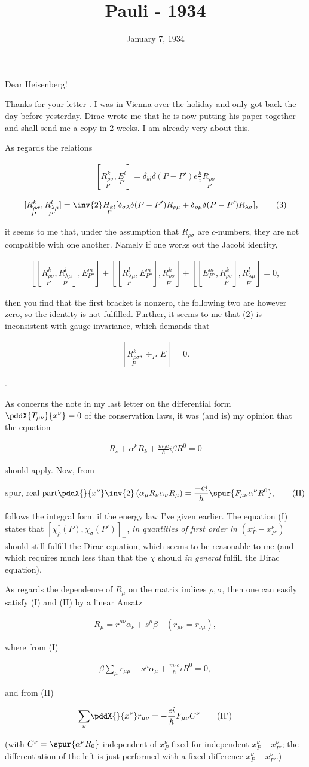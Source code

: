 \documentclass{article}
\title{Pauli - 1934}
\newcommand{\nequ}[2]{
\begin{align*}
#1
\tag{#2}
\end{align*}
}
\newcommand{\uequ}[1]{
\begin{align*}
#1
\end{align*}
}
\newcommand{\sumX}[1]{\underset{#1}{\sum}}
\begin{document}
\date{January 7, 1934}

Dear Heisenberg!

Thanks for your letter . I was in Vienna over the holiday and only got back the day before yesterday. Dirac wrote me that he is now putting his paper together and shall send me a copy in 2 weeks. I am already very  about this.

As regards the relations
\nequ{
[\underset{P}{R^k_{\rho\sigma}}, \underset{P'}{E^l}] =
   \delta_{kl}\delta(P-P')e\frac{h}{i}\underset{P}{R_{\rho\sigma}}
}{2}
\nequ{
[\underset{P}{R^k_{\rho\sigma}}, \underset{P'}{R^l_{\lambda\mu}}] = 
\inv{2} \underset{P}{H_{kl}}[
  \delta_{\sigma\lambda}\delta(P-P')R_{\rho\mu} +
  \delta_{\rho\mu}\delta(P-P')R_{\lambda\sigma}
],
}{3}
it seems to me that, under the assumption that $R_{\rho\sigma}$ are $c$-numbers, they are not compatible with one another. Namely if one works out the Jacobi identity,
\uequ{
[[\underset{P}{R^k_{\rho\sigma}}, \underset{P'}{R^l_{\lambda\mu}}], E^m_{P''}] + 
[[\underset{P}{R^l_{\lambda\mu}}, E^m_{P''}], \underset{P'}{R^k_{\rho\sigma}}] + 
[[E^m_{P''}, \underset{P}{R^k_{\rho\sigma}}], \underset{P'}{R^l_{\lambda\mu}}] = 0,
}
then you find that the first bracket is nonzero, the following two are however zero, so the identity is not fulfilled. Further, it seems to me that (2) is inconsistent with gauge invariance, which demands that
\uequ{
[\underset{P}{R^k_{\rho\sigma}}, \div_{P'}E] = 0.
}
.

As concerns the note in my last letter on the differential form $\pddX{T_{\mu\nu}}{x^\nu}=0$ of the conservation laws, it was (and is) my opinion that the equation
\nequ{
R_\nu + \alpha^k R_k + \frac{m_0 c}{h} i \beta R^0 = 0
}{I}
should apply. Now, from
\nequ{
\text{spur, real part} \pddX{}{x^\nu}\inv{2}\left(\alpha_\mu R_\nu \alpha_\nu R_\mu \right) =
\frac{-ei}{h}\spur{F_{\mu\nu}\alpha^\nu R^0},
}{II}
follows the integral form if the energy law I've given earlier. The equation (I) states that $[\chi^*_\rho(P), \chi_\sigma(P')]_{+}$, \textit{in quantities of first order in} $(x^\nu_P - x^\nu_{P'})$ should still fulfill the Dirac equation, which seems to be reasonable to me (and which requires much less than that the $\chi$ should \textit{in general} fulfill the Dirac equation).

As regards the dependence of $R_\mu$ on the matrix indices $\rho,\sigma$, then one can easily satisfy (I) and (II) by a linear Ansatz
\uequ{
R_\mu = r^{\mu\nu}\alpha_\nu + s^\mu \beta \quad (r_{\mu\nu} = r_{\nu\mu}),
}
where from (I)
\nequ{
\beta\sumX{\mu}r_{\mu\mu} - s^\mu\alpha_\mu + \frac{m_0 c}{h}iR^0 = 0,
}{I'}
and from (II)
\nequ{
\sumX{\nu}\pddX{}{x^\nu} r_{\mu\nu} = -\frac{ei}{h} F_{\mu\nu}C^\nu
}{II'}
(with $C^\nu = \spur{\alpha^\nu R_0}$ independent of $x^\nu_P$ fixed for independent $x^\nu_P - x^\nu_{P'}$; the differentiation of the left is just performed with a fixed difference $x^\nu_P - x^\nu_{P'}$.)
\end{document}
